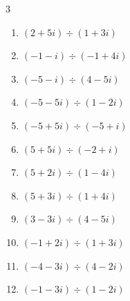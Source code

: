 \begin{multicols}{3}
\begin{enumerate}
  \item $\displaystyle (2+5i)\div(1+3i)$


  \item $\displaystyle (-1-i)\div(-1+4i)$


  \item $\displaystyle (-5-i)\div(4-5i)$


  \item $\displaystyle (-5-5i)\div(1-2i)$

        \phantom{$\displaystyle =1-3i$}

  \item $\displaystyle (-5+5i)\div(-5+i)$


  \item $\displaystyle (5+5i)\div(-2+i)$

        \phantom{$\displaystyle =-1-3i$}

  \item $\displaystyle (5+2i)\div(1-4i)$


  \item $\displaystyle (5+3i)\div(1+4i)$

        \phantom{$\displaystyle =1-i$}

  \item $\displaystyle (3-3i)\div(4-5i)$


  \item $\displaystyle (-1+2i)\div(1+3i)$


\columnbreak %

  \item $\displaystyle (-4-3i)\div(4-2i)$


  \item $\displaystyle (-1-3i)\div(1-2i)$

        \phantom{$\displaystyle =1-i$}


\end{enumerate}
\end{multicols}
